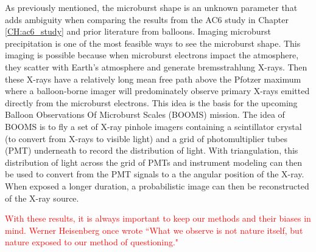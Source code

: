 As previously mentioned, the microburst shape is an unknown parameter that adds ambiguity when comparing the results from the AC6 study in Chapter \ref{CH:ac6_study} and prior literature from balloons. Imaging microburst precipitation is one of the most feasible ways to see the microburst shape. This imaging is possible because when microburst electrons impact the atmosphere, they scatter with Earth's atmosphere and generate bremsstrahlung X-rays. Then these X-rays have a relatively long mean free path above the Pfotzer maximum where a balloon-borne imager will predominately observe primary X-rays emitted directly from the microburst electrons. This idea is the basis for the upcoming Balloon Observations Of Microburst Scales (BOOMS) mission. The idea of BOOMS is to fly a set of X-ray pinhole imagers containing a scintillator crystal (to convert from X-rays to visible light) and a grid of photomultiplier tubes (PMT) underneath to record the distribution of light. With triangulation, this distribution of light across the grid of PMTs and instrument modeling can then be used to convert from the PMT signals to a the angular position of the X-ray. When exposed a longer duration, a probabilistic image can then be reconstructed of the X-ray source.

\textcolor{red}{With these results, it is always important to keep our methods and their biases in mind. Werner Heisenberg once wrote ``What we observe is not nature itself, but nature exposed to our method of questioning." \citet{Heisenberg1958}}